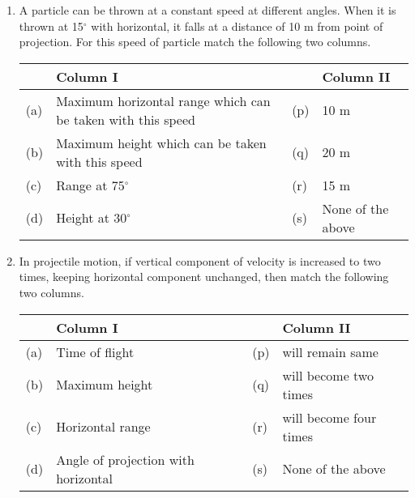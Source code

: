 \documentclass{article}
\begin{document}
\begin{enumerate}
    \item A particle can be thrown at a constant speed at different angles. When it is thrown at 15$^{\circ}$ with horizontal, it falls at a distance of 10 m from point of projection. For this speed of particle match the following two columns.
    \begin{center}
        \renewcommand{\arraystretch}{2}
        \begin{table}[h]
            \centering
            \begin{tabular}{p{0.25cm}p{9.5cm}|p{0.25cm}p{3.5cm}}
            \hline
            & Column I & & Column II \\
            \hline
            (a) & Maximum horizontal range which can be taken with this speed & (p) & 10 m \\
            (b) & Maximum height which can be taken with this speed & (q) & 20 m \\
            (c) & Range at 75$^{\circ}$ & (r) & 15 m \\
            (d) & Height at 30$^{\circ}$ & (s) & None of the above \\
            \hline
            \end{tabular}
        \end{table}
    \end{center}

    \item In projectile motion, if vertical component of velocity is increased to two times, keeping horizontal component unchanged, then match the following two columns.
    \begin{center}
        \renewcommand{\arraystretch}{2}
        \begin{table}[h]
            \centering
            \begin{tabular}{p{0.25cm}p{8cm}|p{0.25cm}p{5cm}}
            \hline
            & Column I & & Column II \\
            \hline
            (a) & Time of flight & (p) & will remain same \\
            (b) & Maximum height & (q) & will become two times \\
            (c) & Horizontal range & (r) & will become four times \\
            (d) & Angle of projection with horizontal & (s) & None of the above \\
            \hline
            \end{tabular}
        \end{table}
    \end{center}


\end{enumerate}
\end{document}
